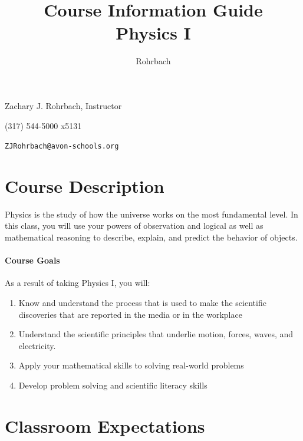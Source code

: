 \documentclass[10pt]{exam}
\title{Course Information Guide \\ Physics I}
\author{Rohrbach}
\begin{document}
\maketitle

\noindent Zachary J. Rohrbach, Instructor

\noindent (317) 544-5000 x5131

\noindent \texttt{ZJRohrbach@avon-schools.org}

\section*{Course Description}

Physics is the study of how the universe works on the most fundamental level.  In this 
class, you will use your powers of observation and logical as well as mathematical 
reasoning to describe, explain, and predict the behavior of objects.

\paragraph{Course Goals} 
As a result of taking Physics I, you will:

\begin{enumerate}
	\item Know and understand the process that is used to make the scientific discoveries that 
				are reported in the media or in the workplace
	\item Understand the scientific principles that underlie motion, forces, waves, and electricity.
	\item Apply your mathematical skills to solving real-world problems
	\item Develop problem solving and scientific literacy skills
\end{enumerate}


\section*{Classroom Expectations}
\end{document}
